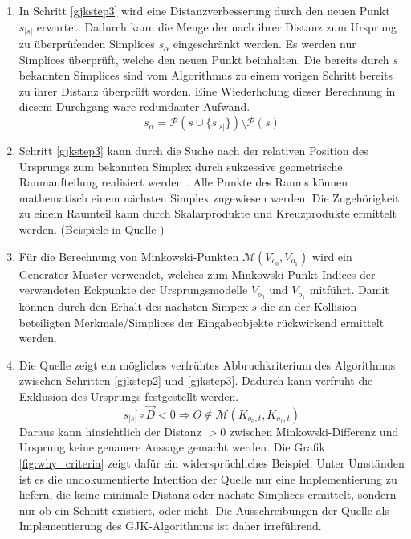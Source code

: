 \begin{enumerate}
\item In Schritt \ref{gjkstep3} wird eine Distanzverbesserung durch den neuen Punkt $s_{|s|}$ erwartet. Dadurch kann die Menge der nach ihrer Distanz zum Ursprung zu überprüfenden Simplices $s_{\alpha}$ eingeschränkt werden. Es werden nur Simplices überprüft, welche den neuen Punkt beinhalten. Die bereits durch $s$ bekannten Simplices sind vom Algorithmus zu einem vorigen Schritt bereits zu ihrer Distanz überprüft worden. Eine Wiederholung dieser Berechnung in diesem Durchgang wäre redundanter Aufwand. \cite{gjk-casey}
$$ s_{\alpha} = \mathcal{P}(s \cup \{s_{|s|}\}) \setminus \mathcal{P}(s)$$

\item Schritt \ref{gjkstep3} kann durch die Suche nach der relativen Position des Ursprungs zum bekannten Simplex durch sukzessive geometrische Raumaufteilung realisiert werden \cite{gjk-casey}. Alle Punkte des Raums können mathematisch einem nächsten Simplex zugewiesen werden. Die Zugehörigkeit zu einem Raumteil kann durch Skalarprodukte und Kreuzprodukte ermittelt werden. (Beispiele in Quelle \cite{gjk-casey})

\item Für die Berechnung von Minkowski-Punkten $\mathcal{M}(V_{o_0}, V_{o_1})$ wird ein Generator-Muster verwendet, welches zum Minkowski-Punkt Indices der verwendeten Eckpunkte der Ursprungsmodelle $V_{o_0}$ und $V_{o_1}$ mitführt. Damit können durch den Erhalt des nächsten Simpex $s$ die an der Kollision beteiligten Merkmale/Simplices der Eingabeobjekte rückwirkend ermittelt werden.

\item Die Quelle \cite{gjk-casey} zeigt ein mögliches verfrühtes Abbruchkriterium des Algorithmus zwischen Schritten \ref{gjkstep2} und \ref{gjkstep3}. Dadurch kann verfrüht die Exklusion des Ursprungs festgestellt werden.
$$\vec{s_{|s|}} \circ \vec{D} < 0 \Rightarrow O \notin \mathcal{M}(K_{o_0, t}, K_{o_1, t})$$
Daraus kann hinsichtlich der Distanz $>0$ zwischen Minkowski-Differenz und Ursprung keine genauere Aussage gemacht werden.
Die Grafik \ref{fig:why_criteria} zeigt dafür ein widersprüchliches Beispiel.
Unter Umständen ist es die undokumentierte Intention der Quelle \cite{gjk-casey} nur eine Implementierung zu liefern, die keine minimale Distanz oder nächste Simplices ermittelt, sondern nur ob ein Schnitt existiert, oder nicht. Die Ausschreibungen der Quelle als Implementierung des GJK-Algorithmus ist daher irreführend.


\end{enumerate}

